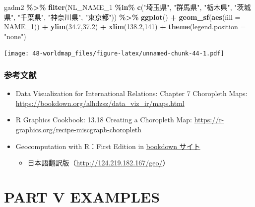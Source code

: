 \documentclass[
  xelatex, ja=standard]{bxjsbook}
\newenvironment{Shaded}{\begin{snugshade}}{\end{snugshade}}
\newcommand{\AttributeTok}[1]{\textcolor[rgb]{0.13,0.29,0.53}{#1}}
\newcommand{\DecValTok}[1]{\textcolor[rgb]{0.00,0.00,0.81}{#1}}
\newcommand{\FloatTok}[1]{\textcolor[rgb]{0.00,0.00,0.81}{#1}}
\newcommand{\FunctionTok}[1]{\textcolor[rgb]{0.13,0.29,0.53}{\textbf{#1}}}
\newcommand{\NormalTok}[1]{#1}
\newcommand{\SpecialCharTok}[1]{\textcolor[rgb]{0.81,0.36,0.00}{\textbf{#1}}}
\newcommand{\StringTok}[1]{\textcolor[rgb]{0.31,0.60,0.02}{#1}}
\providecommand{\tightlist}{%
  \setlength{\itemsep}{0pt}\setlength{\parskip}{0pt}}
\theoremstyle{definition}
\theoremstyle{definition}
\theoremstyle{definition}
\theoremstyle{definition}
\theoremstyle{remark}
\begin{document}
\begin{Shaded}
\begin{Highlighting}[]
\NormalTok{gadm2 }\SpecialCharTok{\%\textgreater{}\%} \FunctionTok{filter}\NormalTok{(NL\_NAME\_1 }\SpecialCharTok{\%in\%} \FunctionTok{c}\NormalTok{(}\StringTok{"埼玉県"}\NormalTok{, }\StringTok{"群馬県"}\NormalTok{, }\StringTok{"栃木県"}\NormalTok{, }\StringTok{"茨城県"}\NormalTok{, }\StringTok{"千葉県"}\NormalTok{, }\StringTok{"神奈川県"}\NormalTok{, }\StringTok{"東京都"}\NormalTok{)) }\SpecialCharTok{\%\textgreater{}\%} 
  \FunctionTok{ggplot}\NormalTok{() }\SpecialCharTok{+} \FunctionTok{geom\_sf}\NormalTok{(}\FunctionTok{aes}\NormalTok{(}\AttributeTok{fill =}\NormalTok{ NAME\_1)) }\SpecialCharTok{+} 
  \FunctionTok{ylim}\NormalTok{(}\FloatTok{34.7}\NormalTok{,}\FloatTok{37.2}\NormalTok{) }\SpecialCharTok{+} \FunctionTok{xlim}\NormalTok{(}\FloatTok{138.2}\NormalTok{,}\DecValTok{141}\NormalTok{) }\SpecialCharTok{+} 
  \FunctionTok{theme}\NormalTok{(}\AttributeTok{legend.position =} \StringTok{"none"}\NormalTok{)}
\end{Highlighting}
\end{Shaded}

\texttt{[image: 48-worldmap\_files/figure-latex/unnamed-chunk-44-1.pdf]}

\hypertarget{ux53c2ux8003ux6587ux732e-2}{%
\section{参考文献}\label{ux53c2ux8003ux6587ux732e-2}}

\begin{itemize}
\item
  Data Visualization for International Relations: Chapter 7 Choropleth Maps: \url{https://bookdown.org/alhdzsz/data_viz_ir/maps.html}
\item
  R Graphics Cookbook: 13.18 Creating a Choropleth Map: \url{https://r-graphics.org/recipe-miscgraph-choropleth}
\item
  Geocomputation with R：First Edition in \href{https://bookdown.org/robinlovelace/geocompr/}{bookdown サイト}

  \begin{itemize}
  \tightlist
  \item
    日本語翻訳版（\url{http://124.219.182.167/geo/}）
  \end{itemize}
\end{itemize}

\hypertarget{part-part-v-examples}{%
\part{PART V EXAMPLES}\label{part-part-v-examples}}
\end{document}
